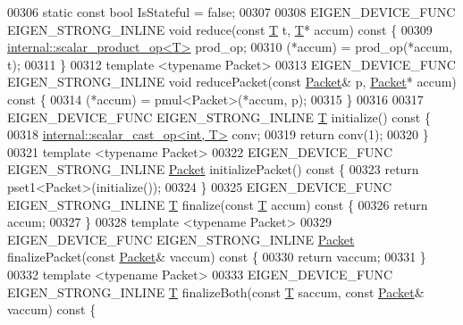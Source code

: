 \begin{DoxyCode}
00306   \textcolor{keyword}{static} \textcolor{keyword}{const} \textcolor{keywordtype}{bool} IsStateful = \textcolor{keyword}{false};
00307 
00308   EIGEN\_DEVICE\_FUNC EIGEN\_STRONG\_INLINE \textcolor{keywordtype}{void} reduce(\textcolor{keyword}{const} \hyperlink{group___sparse_core___module}{T} t, \hyperlink{group___sparse_core___module}{T}* accum)\textcolor{keyword}{ const }\{
00309     \hyperlink{struct_eigen_1_1internal_1_1scalar__product__op}{internal::scalar\_product\_op<T>} prod\_op;
00310     (*accum) = prod\_op(*accum, t);
00311   \}
00312   \textcolor{keyword}{template} <\textcolor{keyword}{typename} Packet>
00313   EIGEN\_DEVICE\_FUNC EIGEN\_STRONG\_INLINE \textcolor{keywordtype}{void} reducePacket(\textcolor{keyword}{const} \hyperlink{union_eigen_1_1internal_1_1_packet}{Packet}& p, 
      \hyperlink{union_eigen_1_1internal_1_1_packet}{Packet}* accum)\textcolor{keyword}{ const }\{
00314     (*accum) = pmul<Packet>(*accum, p);
00315   \}
00316 
00317   EIGEN\_DEVICE\_FUNC EIGEN\_STRONG\_INLINE \hyperlink{group___sparse_core___module}{T} initialize()\textcolor{keyword}{ const }\{
00318     \hyperlink{struct_eigen_1_1internal_1_1scalar__cast__op}{internal::scalar\_cast\_op<int, T>} conv;
00319     \textcolor{keywordflow}{return} conv(1);
00320   \}
00321   \textcolor{keyword}{template} <\textcolor{keyword}{typename} Packet>
00322   EIGEN\_DEVICE\_FUNC EIGEN\_STRONG\_INLINE \hyperlink{union_eigen_1_1internal_1_1_packet}{Packet} initializePacket()\textcolor{keyword}{ const }\{
00323     \textcolor{keywordflow}{return} pset1<Packet>(initialize());
00324   \}
00325   EIGEN\_DEVICE\_FUNC EIGEN\_STRONG\_INLINE \hyperlink{group___sparse_core___module}{T} finalize(\textcolor{keyword}{const} \hyperlink{group___sparse_core___module}{T} accum)\textcolor{keyword}{ const }\{
00326     \textcolor{keywordflow}{return} accum;
00327   \}
00328   \textcolor{keyword}{template} <\textcolor{keyword}{typename} Packet>
00329   EIGEN\_DEVICE\_FUNC EIGEN\_STRONG\_INLINE \hyperlink{union_eigen_1_1internal_1_1_packet}{Packet} finalizePacket(\textcolor{keyword}{const} \hyperlink{union_eigen_1_1internal_1_1_packet}{Packet}& vaccum)\textcolor{keyword}{ const }\{
00330     \textcolor{keywordflow}{return} vaccum;
00331   \}
00332   \textcolor{keyword}{template} <\textcolor{keyword}{typename} Packet>
00333   EIGEN\_DEVICE\_FUNC EIGEN\_STRONG\_INLINE \hyperlink{group___sparse_core___module}{T} finalizeBoth(\textcolor{keyword}{const} \hyperlink{group___sparse_core___module}{T} saccum, \textcolor{keyword}{const} 
      \hyperlink{union_eigen_1_1internal_1_1_packet}{Packet}& vaccum)\textcolor{keyword}{ const }\{

\end{DoxyCode}
